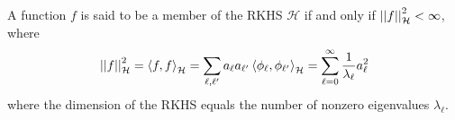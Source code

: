 \documentclass{article}
\newcommand\mc{\mathcal}
\begin{document}
\begin{appendices}
A function $f$ is said to be a member of the RKHS $\mc H$ if and only if $\norm[\mc H]{f}^2 < \infty$, where
\begin{align}
	\norm[\mc H]{f}^2 = \innerprod{f}{f}_{\mc H} = \sum_{\ell, \ell'} a_{\ell} a_{\ell'} \innerprod{\phi_{\ell}}{\phi_{\ell'}}_{\mc H}
	= \sum_{\ell = 0}^{\infty} \inv{\lambda_{\ell}} a_{\ell}^2
\end{align}
where the dimension of the RKHS equals the number of nonzero eigenvalues $\lambda_{\ell}$. 
	
	
	
	
	
	
	
	
	
	
	
	

\end{appendices}

	
	
\end{document}
